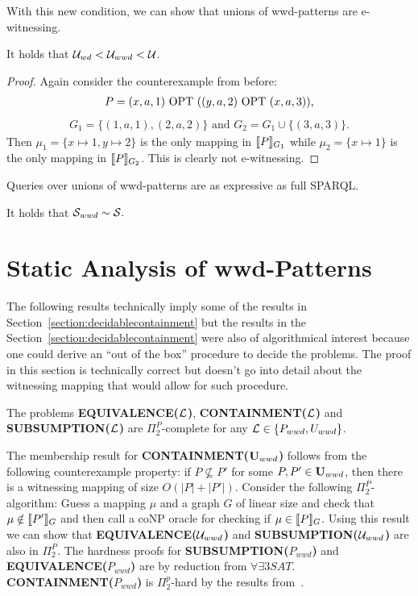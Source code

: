 With this new condition, we can show that unions of wwd-patterns are
e-witnessing. 

\begin{theorem}
	It holds that $\mathcal{U}_{wd} < \mathcal{U}_{wwd} < \mathcal{U}$.
\end{theorem}
\begin{proof}
	Again consider the counterexample from before:	
	\begin{align*}
		P = (x, a, 1) \mbox{ OPT } ((y,a,2) \mbox{ OPT }(x,a,3)),
	\end{align*}
	\begin{align*}
		G_1 = \{(1,a,1),(2,a,2)\} \mbox{ and } G_2 = G_1 \cup \{(3,a,3)\}.
	\end{align*}
	Then $\mu_1 = \{x \mapsto 1, y \mapsto 2\}$ is the only mapping in $\llbracket
	P\rrbracket_{G_1}$ while $\mu_2 = \{x \mapsto 1\}$ is the only mapping in $\llbracket P
	\rrbracket_{G_2}$.
	This is clearly not e-witnessing.
\end{proof}
Queries over unions of wwd-patterns are as expressive as full SPARQL.
\begin{theorem}
	It holds that $\mathcal{S}_{wwd} \sim \mathcal{S}.$
\end{theorem}

\section{Static Analysis of wwd-Patterns}

The following results technically imply some of the results in
Section~\ref{section:decidablecontainment} but the results in the Section~\ref{section:decidablecontainment}
were also of algorithmical interest because one could derive an ``out of the box''
procedure to decide the problems. The proof in this section is technically
correct but doesn't go into detail about the witnessing mapping that would allow
for such procedure.

\begin{theorem}
	The problems \textbf{EQUIVALENCE($\mathcal{L}$)}, \textbf{CONTAINMENT($\mathcal{L}$)} and
	\textbf{SUBSUMPTION($\mathcal{L}$)} are $\Pi_2^P$-complete 
	for any $\mathcal{L} \in \{ P_{wwd}, U_{wwd} \}$.
\end{theorem}
\begin{proofidea}
	The membership result for \textbf{CONTAINMENT($\mathbf{U}_{wwd}$)} follows from the following
	counterexample property: 
	if $P \not\subseteq P'$ for some $P,P' \in \mathbf{U}_{wwd}$, then
	there is a witnessing mapping of size $O(|P| + |P'|)$.
	Consider the following $\Pi^P_2$-algorithm:
	Guess a mapping $\mu$ and a graph $G$ of linear size and check that $\mu
	\notin \llbracket P' \rrbracket_G$ and then call a coNP oracle for checking if $\mu
	\in \llbracket P \rrbracket_G$.
	Using this result we can show that \textbf{EQUIVALENCE($\mathcal{U}_{wwd}$)}  
	and \textbf{SUBSUMPTION($\mathcal{U}_{wwd}$)} are also in $\Pi^P_2$.
	The hardness proofs for \textbf{SUBSUMPTION($P_{wwd}$)} and\\
	\textbf{EQUIVALENCE($P_{wwd}$)} are by reduction from
	$\forall\exists3SAT$.\\
	\textbf{CONTAINMENT($P_{wwd}$)} is $\Pi^p_2$-hard by the results from~\cite{pichler2014containment}.
\end{proofidea}
